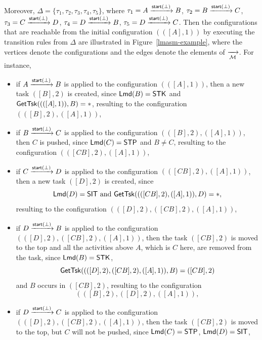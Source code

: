 \begin{example}
	Moreover, $\Delta = \{\tau_1, \tau_2, \tau_3, \tau_4, \tau_5\}$, where 
			$\tau_1 = A \xrightarrow{{\mathsf{start} }(\bot)} B$,
			$\tau_2 = B \xrightarrow{{\mathsf{start} }(\bot)} C$,
			$\tau_3 = C \xrightarrow{{\mathsf{start} }(\bot)} D$,
			$\tau_4 = D \xrightarrow{{\mathsf{start} }(\bot)} B$,
			$\tau_5 = D \xrightarrow{{\mathsf{start} }(\bot)} C$.
	Then the configurations that are reachable from the initial configuration $(([A], 1))$ by executing the transition rules from $\Delta$ are illustrated in Figure~\ref{lmasm-example}, where the vertices denote the configurations and the edges denote the elements of $\xrightarrow[{\mathcal{M} }]{}$. 
	For instance, 
	\begin{itemize}
	\item if $A \xrightarrow{{\mathsf{start} }(\bot)} B$ is applied to the configuration $(([A], 1))$, then a new task $([B],2)$ is created, since ${\sf Lmd}(B) = \mathsf{STK}$ and $\mathsf{GetTsk}((([A],1)), B) = *$, resulting to the configuration $(([B],2),([A],1))$,
	\item if $B \xrightarrow{{\mathsf{start} }(\bot)} C$ is applied to the configuration $(([B],2),([A],1))$, then $C$ is pushed, since ${\sf Lmd}(C) = \mathsf{STP}$ and $B\neq C$, resulting to the configuration $(([CB],2),([A],1))$,
	\item if $C \xrightarrow{{\mathsf{start} }(\bot)} D$ is applied to the configuration $(([CB],2),([A],1))$, then a new task $([D], 2)$ is created, since 
	$${\sf Lmd}(D) = \mathsf{SIT} \mbox{ and } \mathsf{GetTsk}((([CB],2),([A],1)), D) = *,$$ 
	resulting to the configuration $(([D],2),([CB],2),([A],1))$,
	\item if $D \xrightarrow{{\mathsf{start} }(\bot)} B$ is applied to the configuration $(([D],2),([CB],2),([A],1))$, then the task $([CB],2)$ is moved to the top and all the activities above $A$, which is $C$ here, are removed from the task, since ${\sf Lmd}(B) = \mathsf{STK}$, 
	$$\mathsf{GetTsk}((([D],2),([CB],2),([A],1)), B) = ([CB],2)$$
	and $B$ occurs in $([CB], 2)$, resulting to the configuration 
	$$(([B],2),([D],2),([A],1)),$$
	\item if $D \xrightarrow{{\mathsf{start} }(\bot)} C$ is applied to the configuration $(([D],2),([CB],2),([A],1))$, then the task $([CB],2)$ is moved to the top, but $C$ will not be pushed, since ${\sf Lmd}(C) = \mathsf{STP}$, ${\sf Lmd}(D) = \mathsf{SIT}$,

\end{itemize}
\end{example}
